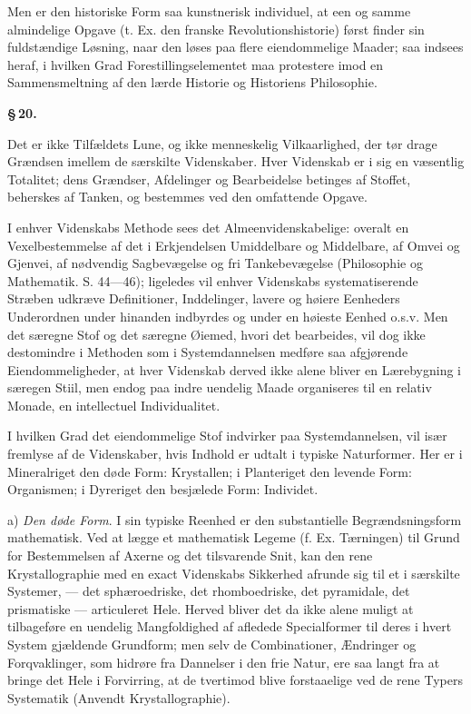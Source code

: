 \documentclass[12pt]{book}
\newcommand{\opage}[1]{\marginnote{\footnotesize\textit{[#1]}}}
\begin{document}
Men er den historiske Form saa kunstnerisk individuel, at een og samme almindelige Opgave
(t. Ex. den franske Revolutionshistorie) først finder sin fuldstændige Løsning, naar den
løses paa flere eiendommelige Maader; saa indsees heraf, i hvilken Grad
Forestillingselementet maa protestere imod en Sammensmeltning af den lærde Historie og
Historiens Philosophie.

\begin{center}{\bfseries \S\,20.}\end{center}

Det er ikke Tilfældets Lune, og ikke menneskelig Vilkaarlighed, der tør drage Grændsen
imellem de særskilte Videnskaber. Hver Videnskab er i sig en væsentlig Totalitet; dens
Grændser, Afdelinger og Bearbeidelse betinges af Stoffet, beherskes af Tanken, og bestemmes
ved den omfattende Opgave.

I enhver Videnskabs Methode sees det Almeenvidenskabelige: overalt en Vexelbestemmelse af
det i Erkjendelsen Umiddelbare og Middelbare, af Omvei og Gjenvei, af nødvendig
Sagbevægelse og fri Tankebevægelse (Philosophie og Mathematik. S. 44—46); ligeledes vil
enhver Videnskabs systematiserende Stræben udkræve Definitioner, Inddelinger, lavere og
høiere Eenheders Underordnen under hinanden indbyrdes og under en høieste Eenhed o.s.v. Men
det særegne Stof og det særegne Øiemed, hvori det bearbeides, vil dog ikke destomindre i
Methoden som i Systemdannelsen
\opage{92} medføre saa afgjørende Eiendommeligheder, at hver Videnskab derved ikke alene bliver en
Lærebygning i særegen Stiil, men endog paa indre uendelig Maade organiseres til en relativ
Monade, en intellectuel Individualitet.

I hvilken Grad det eiendommelige Stof indvirker paa Systemdannelsen, vil især fremlyse af de
Videnskaber, hvis Indhold er udtalt i typiske Naturformer. Her er i Mineralriget den døde
Form: Krystallen; i Planteriget den levende Form: Organismen; i Dyreriget den besjælede
Form: Individet.

a) \emph{Den døde Form}. I sin typiske Reenhed er den substantielle Begrændsningsform
mathematisk. Ved at lægge et mathematisk Legeme (f. Ex. Tærningen) til Grund for
Bestemmelsen af Axerne og det tilsvarende Snit, kan den rene Krystallographie med en exact
Videnskabs Sikkerhed afrunde sig til et i særskilte Systemer, — det sphæroedriske, det
rhomboedriske, det pyramidale, det prismatiske — articuleret Hele. Herved bliver det da ikke
alene muligt at tilbageføre en uendelig Mangfoldighed af afledede Specialformer til deres i
hvert System gjældende Grundform; men selv de Combinationer, Ændringer og Forqvaklinger, som
hidrøre fra Dannelser i den frie Natur, ere saa langt fra at bringe det Hele i Forvirring, at
de tvertimod blive forstaaelige ved de rene Typers Systematik (Anvendt Krystallographie).
\end{document}
